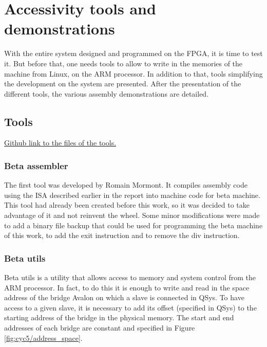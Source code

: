 \chapter{Accessivity tools and demonstrations}

With the entire system designed and programmed on the FPGA, it is time to test it. But before that, 
one needs tools to allow to write in the memories of the machine from Linux, on the ARM processor. 
In addition to that, tools simplifying the development on the system are presented. After the 
presentation of the different tools, the various assembly demonstrations are detailed.

\section{Tools}

\href{https://github.com/AnotherGitAccount/TFE/tree/master/software}{Github link to the files of the tools.}


\subsection{Beta assembler}

The first tool was developed by Romain Mormont. It compiles
assembly code using the ISA described earlier in the report into machine code for beta machine. This tool 
had already been created before this work, so it was decided to take advantage of it and not 
reinvent the wheel. Some minor modifications were made to add a binary file backup that could be 
used for programming the beta machine of this work, to add the exit instruction and to remove the 
div instruction.

\subsection{Beta utils}

Beta utils is a utility that allows access to memory and system control from the ARM processor. In 
fact, to do this it is enough to write and read in the space address of the bridge Avalon on which
a slave is connected in QSys. To have access to a given slave, it is necessary to add its offset 
(specified in QSys) to the starting address of the bridge in the physical memory. The start and end 
addresses of each bridge are constant and specified in Figure \ref{fig:cyc5/address_space}. 

